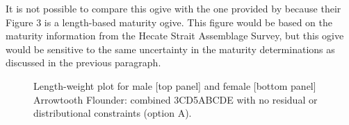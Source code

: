 It is not possible to compare this ogive with the one provided by \citet{arf2001} because their Figure 3 is a length-based maturity ogive. This figure would be based on the maturity information from the Hecate Strait Assemblage Survey, but this ogive would be sensitive to the same uncertainty in the maturity determinations as discussed in the previous paragraph.

\begin{figure}[htp]
\captionsetup[subfigure]{labelformat=empty}
\begin{center}
\newline
{}
\end{center}
\caption{Length-weight plot for male [top panel] and female [bottom panel] Arrowtooth Flounder: combined 3CD5ABCDE with no residual or distributional constraints (option A).}
\label{fig:lwOptionA}
\end{figure}

